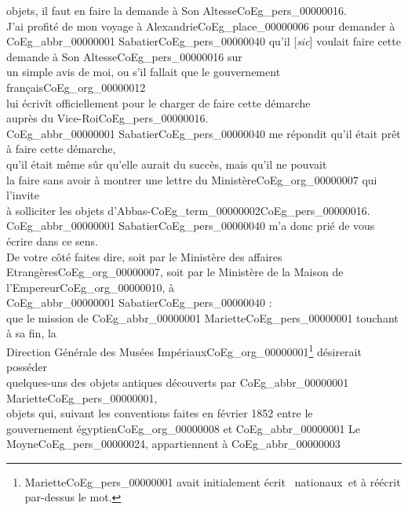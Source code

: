 \documentclass{book}
\begin{document}
objets, il faut en faire la demande à Son Altesse\gls{CoEg_pers_00000016}.\\
\indent J’ai profité de mon voyage à Alexandrie\gls{CoEg_place_00000006} pour demander à\\
\gls{CoEg_abbr_00000001} Sabatier\gls{CoEg_pers_00000040} qu’il {[\textit{sic}]} voulait faire cette demande à Son Altesse\gls{CoEg_pers_00000016} sur\\
un simple avis de moi, ou s’il fallait que le gouvernement français\gls{CoEg_org_00000012}\\
lui écrivît officiellement pour le charger de faire cette démarche\\
auprès du Vice-Roi\gls{CoEg_pers_00000016}.\\
\indent \gls{CoEg_abbr_00000001} Sabatier\gls{CoEg_pers_00000040} me répondit qu’il était prêt à faire cette démarche,\\
qu’il était même sûr qu’elle aurait du succès, mais qu’il ne pouvait\\
la faire sans avoir à montrer une lettre du Ministère\gls{CoEg_org_00000007} qui l’invite\\
à solliciter les objets d’Abbas-\Gls{CoEg_term_00000002}\gls{CoEg_pers_00000016}.\\
\indent \gls{CoEg_abbr_00000001} Sabatier\gls{CoEg_pers_00000040} m’a donc prié de vous écrire dans ce sens.\\
\indent De votre côté faites dire, soit par le Ministère des affaires\\
Etrangères\gls{CoEg_org_00000007}, soit par le Ministère de la Maison de l’Empereur\gls{CoEg_org_00000010}, à\\
\gls{CoEg_abbr_00000001} Sabatier\gls{CoEg_pers_00000040} :\\
\indent que le mission de \gls{CoEg_abbr_00000001} Mariette\gls{CoEg_pers_00000001} touchant à sa fin, la\\
Direction Générale des Musées Impériaux\gls{CoEg_org_00000001}\footnote{Mariette\gls{CoEg_pers_00000001} avait initialement écrit \og ~nationaux~\fg et à réécrit par-dessus le mot.} désirerait posséder\\
quelques-uns des objets antiques découverts par \gls{CoEg_abbr_00000001} Mariette\gls{CoEg_pers_00000001},\\
objets qui, suivant les conventions faites en février 1852 entre le\\
gouvernement égyptien\gls{CoEg_org_00000008} et \gls{CoEg_abbr_00000001} Le Moyne\gls{CoEg_pers_00000024}, appartiennent à \gls{CoEg_abbr_00000003}\\
\end{document}
